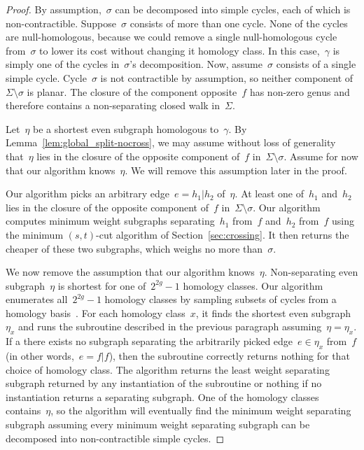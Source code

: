 \documentclass[11pt,twoside]{article}
\begin{document}
{\begin{proof}
By assumption,~$\sigma$ can be decomposed into simple cycles, each of which is non-contractible. Suppose~$\sigma$ consists of more than one cycle. None of the cycles are null-homologous, because we could remove a single null-homologous cycle from~$\sigma$ to lower its cost without changing it homology class.
In this case,~$\gamma$ is simply one of the cycles in~$\sigma$'s decomposition. Now, assume~$\sigma$ consists of a single simple cycle. Cycle~$\sigma$ is not contractible by assumption, so neither component of $\Sigma \setminus \sigma$ is planar. The closure of the component opposite~$f$ has non-zero genus and therefore contains a non-separating closed walk in~$\Sigma$.

Let~$\eta$ be a shortest even subgraph homologous to~$\gamma$.
By Lemma~\ref{lem:global_split-nocross}, we may assume without loss of generality that~$\eta$ lies in the closure of the opposite component of~$f$ in~$\Sigma \setminus \sigma$. Assume for now that our algorithm knows~$\eta$. We will remove this assumption later in the proof.

Our algorithm picks an arbitrary edge~$e = h_1 | h_2$ of~$\eta$. At least one of~$h_1$ and~$h_2$ lies in the closure of the opposite component of~$f$ in~$\Sigma \setminus \sigma$. Our algorithm computes minimum weight subgraphs separating~$h_1$ from~$f$ and~$h_2$ from~$f$ using the minimum $(s,t)$-cut algorithm of Section~\ref{sec:crossing}. It then returns the cheaper of these two subgraphs, which weighs no more than~$\sigma$.

We now remove the assumption that our algorithm knows~$\eta$. Non-separating even subgraph~$\eta$ is shortest for one of~$2^{2g}-1$ homology classes. Our algorithm enumerates all~$2^{2g}-1$ homology classes by sampling subsets of cycles from a homology basis~\cite{e-dgteg-03}. For each homology class~$x$, it finds the shortest even subgraph~$\eta_x$ and runs the subroutine described in the previous paragraph assuming~$\eta = \eta_x$. If a there exists no subgraph separating the arbitrarily picked edge~$e \in \eta_x$ from~$f$ (in other words,~$e = f | f$), then the subroutine correctly returns nothing for that choice of homology class.
The algorithm returns the least weight separating subgraph returned by any instantiation of the subroutine or nothing if no instantiation returns a separating subgraph.
One of the homology classes contains~$\eta$, so the algorithm will eventually find the minimum weight separating subgraph assuming every minimum weight separating subgraph can be decomposed into non-contractible simple cycles.
\end{proof}

}
\end{document}
